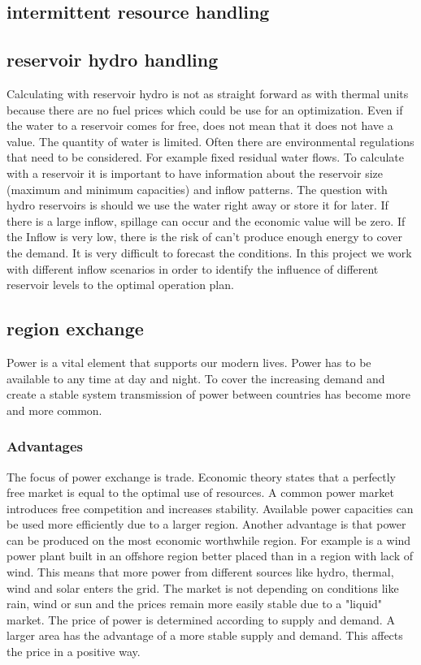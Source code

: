 \documentclass{article}
\begin{document}
\subsection{intermittent resource handling}
\subsection{reservoir hydro handling}
Calculating with reservoir hydro is not as straight forward as with thermal units because there are no fuel prices which could be use for an optimization. Even if the water to a reservoir comes for free, does not mean that it does not have a value. The quantity of water is limited. Often there are environmental regulations that need to be considered. For example fixed residual water flows. To calculate with a reservoir it is important to have information about the reservoir size (maximum and minimum capacities) and inflow patterns. The question with hydro reservoirs is should we use the water right away or store it for later. If there is a large inflow, spillage can occur and the economic value will be zero. If the Inflow is very low, there is the risk of can’t produce enough energy to cover the demand. It is very difficult to forecast the conditions. In this project we work with different inflow scenarios in order to identify the influence of different reservoir levels to the optimal operation plan.
\subsection{region exchange}
Power is a vital element that supports our modern lives. Power has to be available to any time at day and night. To cover the increasing demand and create a stable system transmission of power between countries has become more and more common. 
\subsubsection{Advantages}
The focus of power exchange is trade. Economic theory states that a perfectly free market is equal to the optimal use of resources. A common power market introduces free competition and increases stability. Available power capacities can be used more efficiently due to a larger region. Another advantage is that power can be produced on the most economic worthwhile region. For example is a wind power plant built in an offshore region better placed than in a region with lack of wind. This means that more power from different sources like hydro, thermal, wind and solar enters the grid. The market is not depending on conditions like rain, wind or sun and the prices remain more easily stable due to a "liquid" market. The price of power is determined according to supply and demand. A larger area has the advantage of a more stable supply and demand. This affects the price in a positive way.
\end{document}
